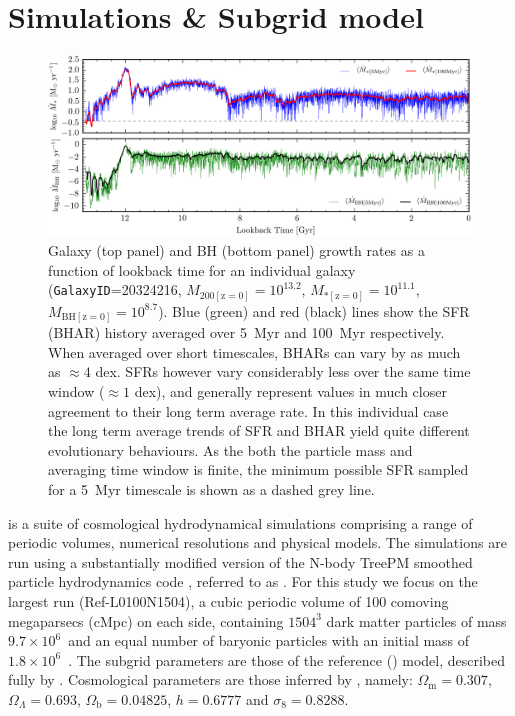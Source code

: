 \section{Simulations \& Subgrid model}
\label{sect:simulationsandsubgrid}

\begin{figure}
\includegraphics[width=\textwidth]{plots/IndividualHistory}

\caption{Galaxy (top panel) and BH (bottom panel) growth rates as a function of
lookback time for an individual galaxy ({\tt GalaxyID}=20324216,
$M_{\mathrm{200[z=0]}}=10^{13.2}$\Msol, $M_{\mathrm{*[z=0]}}=10^{11.1}$\Msol,
$M_{\mathrm{BH[z=0]}}=10^{8.7}$\Msol). Blue (green) and red (black) lines show
the SFR (BHAR) history averaged over 5~Myr and 100~Myr respectively. When
averaged over short timescales, BHARs can vary by as much as $\approx 4$ dex.
SFRs however vary considerably less over the same time window ($\approx 1$
dex), and generally represent values in much closer agreement to their long
term average rate. In this individual case the long term average trends of SFR
and BHAR yield quite different evolutionary behaviours. As the both the
particle mass and averaging time window is finite, the minimum possible SFR
sampled for a 5~Myr timescale is shown as a dashed grey line.} 

\label{fig:variability}
\end{figure}

\eagle is a suite of cosmological hydrodynamical simulations comprising a range
of periodic volumes, numerical resolutions and physical models. The simulations
are run using a substantially modified version of the N-body TreePM smoothed
particle hydrodynamics code  \citep{Springel2005}, referred to as
\anarchy \citep[Dalla Vecchia, \textit{in prep}; see also see also appendix A
of][]{Schaye2015}.  For this study we focus on the largest run
(Ref-L0100N1504), a cubic periodic volume of 100 comoving megaparsecs (cMpc) on
each side, containing $1504^{3}$ dark matter particles of mass $9.7 \times
10^{6}$~\Msol and an equal number of baryonic particles with an initial mass of
$1.8 \times 10^{6}$~\Msol. The subgrid parameters are those of the \eagle
reference () model, described fully by \citet{Schaye2015}.
Cosmological parameters are those inferred by \citet{Planck2013}, namely:
$\Omega_{\mathrm{m}}=0.307$, $\Omega_{\Lambda}=0.693$,
$\Omega_{\mathrm{b}}=0.04825$, $h = 0.6777$ and $\sigma_{8}=0.8288$.

